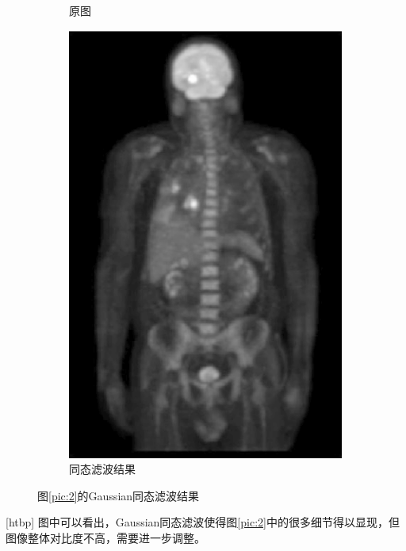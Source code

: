 \documentclass[a4paper]{ctexart}
\newcommand{\outwtwo}{0.4\textwidth}
\begin{document}
\begin{spacing}{1.35}
\begin{figure}[htbp]
\begin{subfigure}[t]{\outwtwo}
			\caption{原图}
		\end{subfigure}
		\begin{subfigure}[t]{\outwtwo}
			\centering
			\includegraphics[width=\textwidth]{figure/2homo.png}
			\caption{同态滤波结果}
		\end{subfigure}
		\caption{图\ref{pic:2}的Gaussian同态滤波结果}
		\label{fig:2homo}
	\end{figure}[htbp]
	图中可以看出，Gaussian同态滤波使得图\ref{pic:2}中的很多细节得以显现，但图像整体对比度不高，需要进一步调整。


\end{spacing}
\end{document}
